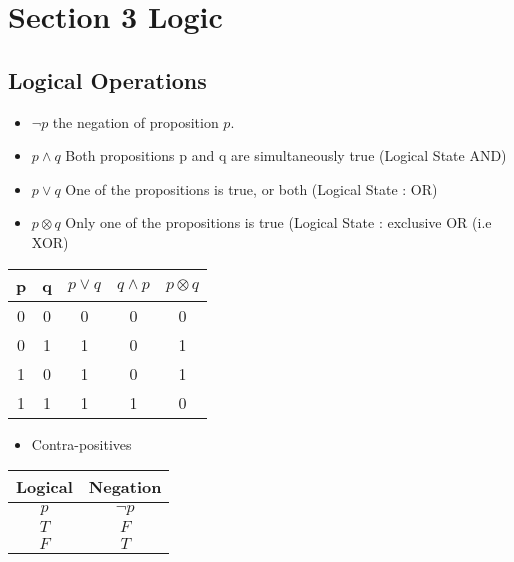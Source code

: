\documentclass[12pt]{article}
\begin{document}
\section{Section 3 Logic}
\subsection{Logical Operations}
\begin{itemize}
\item $\neg p$ the negation of proposition $p$.
\item $p \wedge q$ Both propositions p and q are simultaneously true (Logical State AND)
\item $p \vee q $ One of the propositions is true, or both (Logical State : OR)
\item $p \otimes q$ Only one of the propositions is true (Logical State : exclusive OR (i.e XOR)
\end{itemize}
\begin{center}
\begin{tabular}{|c|c|c|c|c|}
\hline
p & q & $p \vee q$ & $q \wedge p$ & $p \otimes q$ \\
\hline
0 & 0 & 0 & 0 & 0 \\
0 & 1 & 1 & 0 & 1\\
1 & 0 & 1 & 0 & 1 \\
1 & 1 & 1 & 1 & 0\\
\hline
\end{tabular}
\end{center}






\begin{itemize}
	\item Contra-positives
\end{itemize}



\begin{center}
	\begin{tabular}{|c|c|}
		Logical & Negation \\ \hline
		$p$	& $\neg p$ \\ \hline
		$T$	& $F$      \\ \hline
		$F$	& $T$      \\ \hline
	\end{tabular}
\end{center}
\end{document}
